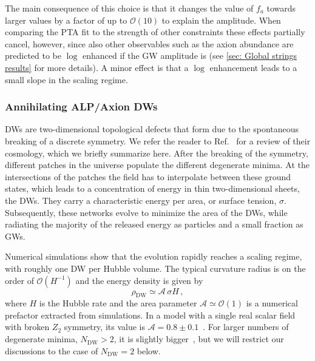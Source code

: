 \documentclass{article}
\begin{document}
The main consequence of this choice is that it changes the value of $f_a$ towards larger values by a factor of up to $\mathcal{O}(10)$ to explain the amplitude.
When comparing the PTA fit to the strength of other constraints these effects partially cancel, however, since also other observables such as the axion abundance are predicted to be $\log$ enhanced if the GW amplitude is (see \cref{sec: Global strings results} for more details).  A minor effect is that a $\log$ enhancement leads to a small slope in the scaling regime.

    
%
\subsubsection{Annihilating ALP/Axion DWs}
\label{sec:ALP_DW}
%

DWs are two-dimensional topological defects that form due to the spontaneous breaking of a discrete symmetry. We refer the reader to Ref.~\cite{Saikawa:2017hiv} for a review of their cosmology, which we briefly summarize here. After the breaking of the symmetry, different patches in the universe populate the different degenerate minima. At the intersections of the patches the field has to interpolate between these ground states, which leads to a concentration of energy in thin two-dimensional sheets, the DWs. They carry a characteristic energy per area, or surface tension, $\sigma$. Subsequently, these networks evolve to minimize the area of the DWs, while radiating the majority of the released energy as particles and a small fraction as GWs.

Numerical simulations show that the evolution rapidly reaches a scaling regime, with roughly one DW per Hubble volume.
The  typical curvature radius is on the order of $\mathcal{O}(H^{-1})$ and the energy density is given by
\begin{equation}
    \rho_\mathrm{DW} \simeq \mathcal{A} \, \sigma H\,,
\end{equation}
where $H$ is the Hubble rate and the area parameter $\mathcal{A} \simeq \mathcal{O}(1)$ is a numerical prefactor extracted from simulations. In a model with a single real scalar field with broken $Z_2$ symmetry, its value is $\mathcal{A}= 0.8\pm 0.1$~\cite{Hiramatsu:2013qaa}.  For larger numbers of degenerate minima, $N_\mathrm{DW}>2$, it is slightly bigger~\cite{Kawasaki:2014sqa}, but we will restrict our discussions to the case of $N_\mathrm{DW}=2$ below. 
\end{document}
